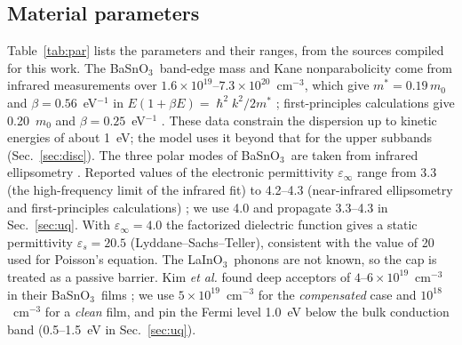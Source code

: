 \documentclass[11pt]{article}
\newcommand{\LIO}{\texorpdfstring{LaInO$_3$}{LaInO3}}
\newcommand{\BSO}{\texorpdfstring{BaSnO$_3$}{BaSnO3}}
\begin{document}
\subsection{Material parameters}
Table~\ref{tab:par} lists the parameters and their ranges, from the sources compiled for this work. The \BSO\ band-edge mass and Kane nonparabolicity come from infrared measurements over $1.6\times10^{19}$--$7.3\times10^{20}$~cm$^{-3}$, which give $m^*=0.19\,m_0$ and $\beta=0.56$~eV$^{-1}$ in $E(1+\beta E)=\hslash^2k^2/2m^*$ \cite{Niedermeier2017}; first-principles calculations give 0.20~$m_0$ and $\beta=0.25$~eV$^{-1}$ \cite{Krishnaswamy2017}. These data constrain the dispersion up to kinetic energies of about 1~eV; the model uses it beyond that for the upper subbands (Sec.~\ref{sec:disc}). The three polar modes of \BSO\ are taken from infrared ellipsometry \cite{Stanislavchuk2012}. Reported values of the electronic permittivity $\varepsilon_\infty$ range from 3.3 (the high-frequency limit of the infrared fit) to 4.2--4.3 (near-infrared ellipsometry and first-principles calculations) \cite{Stanislavchuk2012,Krishnaswamy2017,Aggoune2022}; we use 4.0 and propagate 3.3--4.3 in Sec.~\ref{sec:uq}. With $\varepsilon_\infty=4.0$ the factorized dielectric function gives a static permittivity $\varepsilon_s=20.5$ (Lyddane--Sachs--Teller), consistent with the value of 20 used for Poisson's equation. The \LIO\ phonons are not known, so the cap is treated as a passive barrier. Kim \emph{et al.} found deep acceptors of $4$--$6\times10^{19}$~cm$^{-3}$ in their \BSO\ films \cite{Kim2019LIO}; we use $5\times10^{19}$~cm$^{-3}$ for the \emph{compensated} case and $10^{18}$~cm$^{-3}$ for a \emph{clean} film, and pin the Fermi level 1.0~eV below the bulk conduction band (0.5--1.5~eV in Sec.~\ref{sec:uq}).
\end{document}
